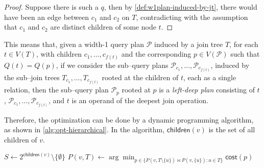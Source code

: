 \begin{proof}
    Suppose there is such a $q$, then by \cref{def:w1plan-induced-by-jt}, there would have been an edge between $c_1$ and $c_2$ on $T$, contradicting with the assumption that $c_1$ and $c_2$ are distinct children of some node $t$.
\end{proof}

This means that, given a width-1 query plan $\mathcal{P}$ induced by a join tree $T$, for each $t \in V(T)$, with children $c_1, \dots, c_{f(t)}$ and the corresponding $p \in V(\mathcal{P})$ such that $Q(t) = Q(p)$, if we consider the sub–query plans $\mathcal{P}_{c_1}, \dots, \mathcal{P}_{c_{f(t)}}$, induced by the sub–join trees $T_{c_1}, \dots, T_{c_{f(t)}}$ rooted at the children of $t$, each as a single relation, then the sub–query plan $\mathcal{P}_p$ rooted at $p$ is a \emph{left-deep plan} consisting of $t$, $\mathcal{P}_{c_1}, \dots, \mathcal{P}_{c_{f(t)}}$, and $t$ is an operand of the deepest join operation.

Therefore, the optimization can be done by a dynamic programming algorithm, as shown in \cref{alg:opt-hierarchical}. In the algorithm, $\mathsf{children}(v)$ is the set of all children of $v$.



\begin{algorithm}
\caption{Finding the optimal width-1 query plan induced by a join tree} \label{alg:opt-hierarchical}

 {
     {
         
    }
     {
        $S \gets 2^{\mathsf{children}(v)} \setminus \{ \emptyset \}$ \;
    } 
     {
        $P(v, T) \gets \arg\!\min_{p \in \{ P(v, T \setminus \{ u \}) \bowtie P(v, \{ u \}) : u \in T \}} \mathsf{cost}(p)$ \label{alg-line:opt-hierarchical-last} \;
    }
}
 \;

\end{algorithm}

